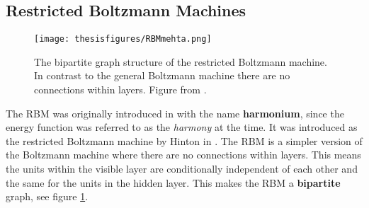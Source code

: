 \documentclass[twoside,english]{uiofysmaster}
\begin{document}



\subsection{Restricted Boltzmann Machines}
\label{sec:RBM}

\begin{figure}
\centering
 \texttt{[image: thesisfigures/RBMmehta.png]}
 \caption{The bipartite graph structure of the restricted Boltzmann machine. In contrast to the general Boltzmann machine there are no connections within layers. Figure from \cite{Mehta2018}.}
 \label{fig:RBMmehta}
\end{figure}


The RBM was originally introduced in \cite{Smolensky1986} with the name \textbf{harmonium}, since the energy function was referred to as the \textit{harmony} at the time. It was introduced as the restricted Boltzmann machine by Hinton in \cite{Hinton2002}.
The RBM is a simpler version of the Boltzmann machine where there are no connections within layers. This means the units within the visible layer are conditionally independent of each other and the same for the units in the hidden layer. This makes the RBM a \textbf{bipartite} graph, see figure \ref{fig:RBMmehta}.


\end{document}
